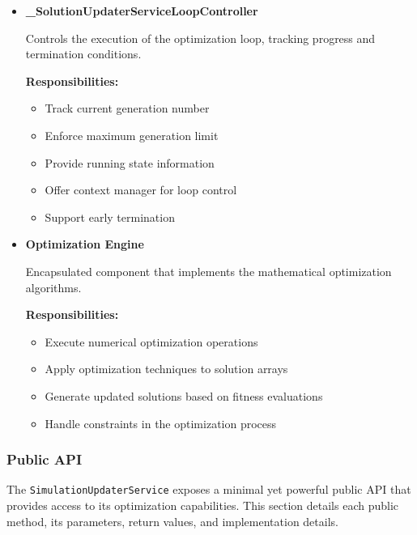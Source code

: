 \begin{itemize}
\item \textbf{\_SolutionUpdaterServiceLoopController}

Controls the execution of the optimization loop, tracking progress and termination conditions.

\textbf{Responsibilities:}
\begin{itemize}
	\item Track current generation number
	\item Enforce maximum generation limit
	\item Provide running state information
	\item Offer context manager for loop control
	\item Support early termination
\end{itemize}

\item \textbf{Optimization Engine}

Encapsulated component that implements the mathematical optimization algorithms.

\textbf{Responsibilities:}
\begin{itemize}
	\item Execute numerical optimization operations
	\item Apply optimization techniques to solution arrays
	\item Generate updated solutions based on fitness evaluations
	\item Handle constraints in the optimization process
\end{itemize}

\end{itemize}

\subsubsection{Public API}

The \texttt{SimulationUpdaterService} exposes a minimal yet powerful public API that provides access to its optimization capabilities. This section details each public method, its parameters, return values, and implementation details.

